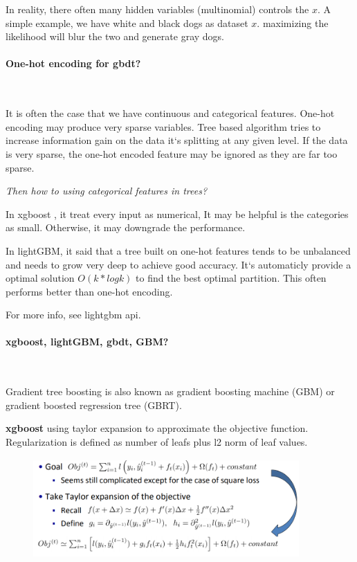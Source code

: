 \documentclass{article}
\begin{document}
In reality, there often many hidden variables (multinomial) controls the $x$. A simple example, we have white and black dogs as dataset $x$. maximizing the likelihood will blur the two and generate gray dogs.

\paragraph{One-hot encoding for gbdt?}~{}

It is often the case that we have continuous and categorical features. One-hot encoding may produce very sparse variables. Tree based algorithm tries to increase information gain on the data it`s splitting at any given level. If the data is very sparse, the one-hot encoded feature may be ignored as they are far too sparse. 

\textit{Then how to using categorical features  in trees?} 

In xgboost \cite{DBLP:conf/kdd/ChenG16}, it treat every input as numerical, It may be helpful is the categories as small. Otherwise, it may downgrade the performance. 

In lightGBM, it said that a tree built on one-hot features tends to be unbalanced and needs to grow very deep to achieve good accuracy. It`s automaticly provide a optimal solution $O(k*logk)$ to find the best optimal partition. This often performs better than one-hot encoding. 

For more info, see lightgbm api.

\paragraph{xgboost, lightGBM, gbdt, GBM?}~{}

Gradient tree boosting is also known as gradient boosting machine (GBM) or gradient boosted regression tree (GBRT). 

\textbf{xgboost} using taylor expansion to approximate the objective function. Regularization is defined as number of leafs plus l2 norm of leaf values.
 
\begin{figure}[H]
\centering
\includegraphics[width=4in,height=1.5in]{taylor}
\caption{}
\end{figure}
\end{document}
